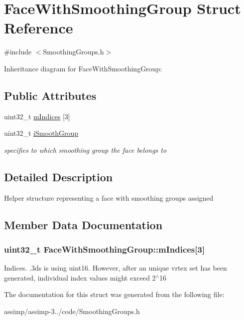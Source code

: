 \hypertarget{struct_face_with_smoothing_group}{\section{Face\+With\+Smoothing\+Group Struct Reference}
\label{struct_face_with_smoothing_group}
}


{\ttfamily \#include $<$Smoothing\+Groups.\+h$>$}



Inheritance diagram for Face\+With\+Smoothing\+Group\+:
\subsection*{Public Attributes}
\begin{DoxyCompactItemize}
\item 
uint32\+\_\+t \hyperlink{struct_face_with_smoothing_group_a3d786b58423df98555929f67c3b80606}{m\+Indices} \mbox{[}3\mbox{]}
\item 
\hypertarget{struct_face_with_smoothing_group_a686bc8272adeb1b5c376483ebfab3ec1}{uint32\+\_\+t \hyperlink{struct_face_with_smoothing_group_a686bc8272adeb1b5c376483ebfab3ec1}{i\+Smooth\+Group}}\label{struct_face_with_smoothing_group_a686bc8272adeb1b5c376483ebfab3ec1}

\begin{DoxyCompactList}\small\item\em specifies to which smoothing group the face belongs to \end{DoxyCompactList}\end{DoxyCompactItemize}


\subsection{Detailed Description}
Helper structure representing a face with smoothing groups assigned 

\subsection{Member Data Documentation}
\hypertarget{struct_face_with_smoothing_group_a3d786b58423df98555929f67c3b80606}{
\subsubsection[{m\+Indices}]{\setlength{\rightskip}{0pt plus 5cm}uint32\+\_\+t Face\+With\+Smoothing\+Group\+::m\+Indices\mbox{[}3\mbox{]}}}\label{struct_face_with_smoothing_group_a3d786b58423df98555929f67c3b80606}
Indices. .3ds is using uint16. However, after an unique vrtex set has been generated, individual index values might exceed 2$^\wedge$16 

The documentation for this struct was generated from the following file\+:\begin{DoxyCompactItemize}
\item 
assimp/assimp-\/3../code/Smoothing\+Groups.\+h\end{DoxyCompactItemize}
